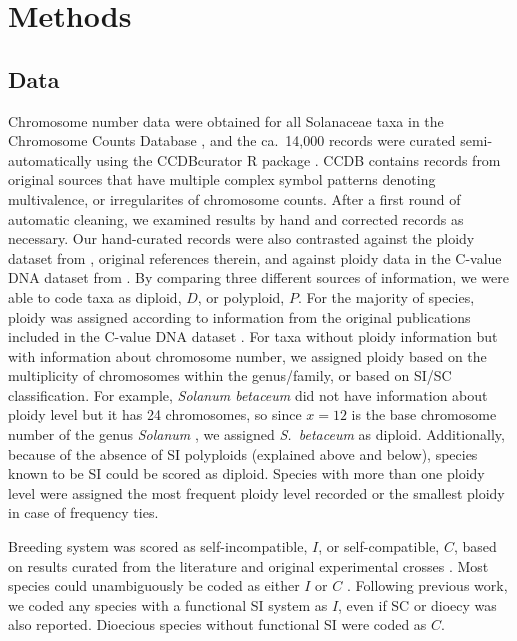 \section{Methods}

\subsection{Data}


Chromosome number data were obtained for all Solanaceae taxa in the Chromosome Counts Database \citep[CCDB;][]{rice_2015}, and the ca.~14,000 records were curated semi-automatically using the CCDBcurator R package \citep{rivero_2019}.
CCDB contains records from original sources that have multiple complex symbol patterns denoting multivalence, or irregularites of chromosome counts.
After a first round of automatic cleaning, we examined results by hand and corrected records as necessary.
Our hand-curated records were also contrasted against the ploidy dataset from \citet{robertson_2011}, original references therein, and against ploidy data in the C-value DNA dataset from \citet{bennett_2005}.
By comparing three different sources of information, we were able to code taxa as diploid, $D$, or polyploid, $P$.
For the majority of species, ploidy was assigned according to information from the original publications included in the  C-value DNA dataset \citep{bennett_2005}.
For taxa without ploidy information but with information about chromosome number, we assigned ploidy based on the multiplicity of chromosomes within the genus/family, or based on SI/SC classification.
For example, \textit{Solanum betaceum} did not have information about ploidy level but it has 24 chromosomes, so since $x=12$ is the base chromosome number of the genus \textit{Solanum} \citep{olmstead_2007}, we assigned \textit{S.~betaceum} as diploid. 
Additionally, because of the absence of SI polyploids (explained above and below), species known to be SI could be scored as diploid.
Species with more than one ploidy level were assigned the most frequent ploidy level recorded or the smallest ploidy in case of frequency ties.

Breeding system was scored as self-incompatible, $I$, or self-compatible, $C$, based on results curated from the literature and original experimental crosses \citep[as compiled in][]{igic_2006, goldberg_2010, robertson_2011, goldberg_2012}.
Most species could unambiguously be coded as either $I$ or $C$ \citep{raduski_2012}.
Following previous work, we coded any species with a functional SI system as $I$, even if SC or dioecy was also reported.
Dioecious species without functional SI were coded as $C$.

